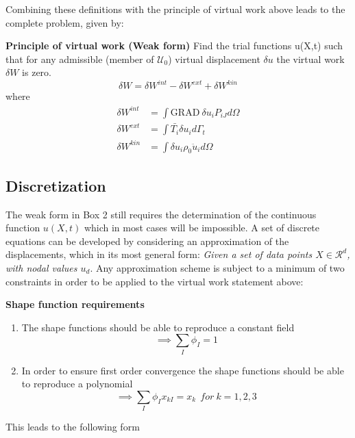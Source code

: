 Combining these definitions with the principle of virtual work above leads to the complete problem, given by:
\begin{tcolorbox}
	\textbf{Principle of virtual work (Weak form)}
	Find the trial functions u(X,t) such that for any admissible (member of $\mathcal{U}_0$) virtual displacement $\delta u$ the virtual work $\delta W $ is zero.
	\begin{equation*}
	\delta W = \delta W^{int} - \delta W^{ext} + \delta W^{kin} 
	\end{equation*}
	where 
	\begin{align*}
	\delta W^{int} &= \int{\text{GRAD}~\delta u_i P_{iJ}d \Omega} \\
	\delta W^{ext} &=  \int{\bar{T_i} \delta u_i} d \Gamma_t \\
	\delta W^{kin} &= \int{\delta u_i \rho_0 \ddot{u}_i d \Omega}
	\end{align*}
\end{tcolorbox}
\subsection*{Discretization}
The weak form in Box 2 still requires the determination of the continuous function $u(X,t)$ which in most cases will be impossible. A set of discrete equations can be developed by considering an approximation of the displacements, which in its most general form: \emph{Given a set of data points $X \in \mathcal{R}^d$, with nodal values $u_d$}. Any approximation scheme is subject to a minimum of two constraints in order to be applied to the virtual work statement above:
\begin{tcolorbox}
\textbf{	Shape function requirements}
	\begin{enumerate}
		\item The shape functions should be able to reproduce a constant field
		\begin{equation*}
		\implies \sum_I \phi_I = 1
		\end{equation*}
		\item In order to ensure first order convergence the shape functions should be able to reproduce a polynomial
		\begin{equation*}
		\implies \sum_I \phi_I x_{kI} = x_k ~~ for~k=1,2,3
		\end{equation*}
	\end{enumerate}
\end{tcolorbox}
\noindent This leads to the following form

